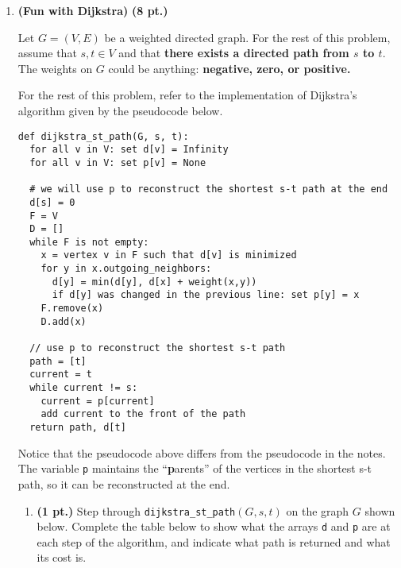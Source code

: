 \documentclass{article}
\begin{document}
\begin{enumerate}
  \item \textbf{(Fun with Dijkstra)} \textbf{(8 pt.)}

    Let $G = (V,E)$ be a weighted directed graph. For the rest of this problem,
    assume that $s, t \in V$ and that \textbf{there exists a directed path from
    $s$ to $t$}. The weights on $G$ could be anything: \textbf{negative, zero, or
    positive.}

    For the rest of this problem, refer to the implementation of Dijkstra's 
    algorithm given by the pseudocode below.

\begin{verbatim}
def dijkstra_st_path(G, s, t):
  for all v in V: set d[v] = Infinity
  for all v in V: set p[v] = None 
  
  # we will use p to reconstruct the shortest s-t path at the end
  d[s] = 0
  F = V
  D = []
  while F is not empty:
    x = vertex v in F such that d[v] is minimized
    for y in x.outgoing_neighbors:
      d[y] = min(d[y], d[x] + weight(x,y))
      if d[y] was changed in the previous line: set p[y] = x
    F.remove(x)
    D.add(x)
        
  // use p to reconstruct the shortest s-t path
  path = [t]
  current = t
  while current != s:
    current = p[current]
    add current to the front of the path
  return path, d[t]
\end{verbatim}

    Notice that the pseudocode above differs from the pseudocode in the notes. The
    variable \verb|p| maintains the ``\textbf{p}arents'' of the vertices in the
    shortest s-t path, so it can be reconstructed at the end.

    \begin{enumerate}
      \item \textbf{(1 pt.)} Step through \texttt{dijkstra\_st\_path}$(G,s,t)$ on
        the graph $G$ shown below. Complete the table below to show what the arrays
        \texttt{d} and \texttt{p} are at each step of the algorithm, and indicate
        what path is returned and what its cost is.


\end{enumerate}
\end{enumerate}
\end{document}
